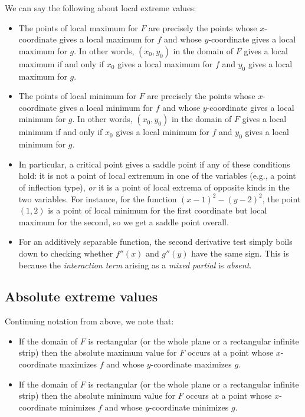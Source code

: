 \documentclass[10pt]{amsart}
\begin{document}
We can say the following about local extreme values:

\begin{itemize}
\item The points of local maximum for $F$ are precisely the points
  whose $x$-coordinate gives a local maximum for $f$ and whose
  $y$-coordinate gives a local maximum for $g$. In other words,
  $(x_0,y_0)$ in the domain of $F$ gives a local maximum if and only
  if $x_0$ gives a local maximum for $f$ and $y_0$ gives a local
  maximum for $g$.
\item The points of local minimum for $F$ are precisely the points
  whose $x$-coordinate gives a local minimum for $f$ and whose
  $y$-coordinate gives a local minimum for $g$. In other words,
  $(x_0,y_0)$ in the domain of $F$ gives a local minimum if and only
  if $x_0$ gives a local minimum for $f$ and $y_0$ gives a local
  minimum for $g$.
\item In particular, a critical point gives a saddle point if any of
  these conditions hold: it is not a point of local extremum in one of
  the variables (e.g., a point of inflection type), {\em or} it is a
  point of local extrema of opposite kinds in the two variables. For
  instance, for the function $(x - 1)^2 - (y - 2)^2$, the point
  $(1,2)$ is a point of local minimum for the first coordinate but
  local maximum for the second, so we get a saddle point overall.
\item For an additively separable function, the second derivative test
  simply boils down to checking whether $f''(x)$ and $g''(y)$ have the
  same sign. This is because the {\em interaction term} arising as a
  {\em mixed partial} is {\em absent}.
\end{itemize}

\subsection{Absolute extreme values}

Continuing notation from above, we note that:

\begin{itemize}
\item If the domain of $F$ is rectangular (or the whole plane or a
  rectangular infinite strip) then the absolute maximum value for $F$
  occurs at a point whose $x$-coordinate maximizes $f$ and whose
  $y$-coordinate maximizes $g$.
\item If the domain of $F$ is rectangular (or the whole plane or a
  rectangular infinite strip) then the absolute minimum value for $F$
  occurs at a point whose $x$-coordinate minimizes $f$ and whose
  $y$-coordinate minimizes $g$.
\end{itemize}
\end{document}
